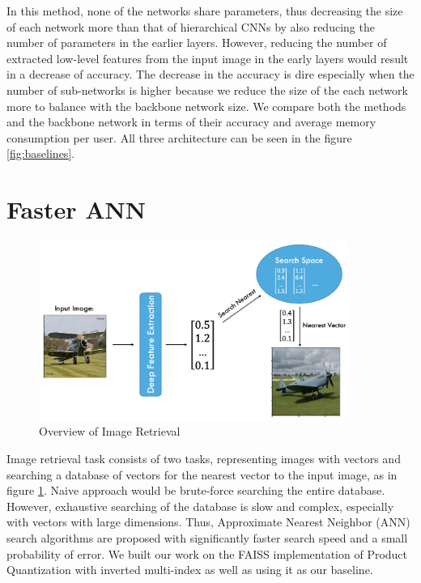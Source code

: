 In this method, none of the networks share parameters, thus decreasing the size of each network more than that of hierarchical CNNs by also reducing the number of parameters in the earlier layers. 
However, reducing the number of extracted low-level features from the input image in the early layers would result in a decrease of accuracy. 
The decrease in the accuracy is dire especially when the number of sub-networks is higher because we reduce the size of the each network more to balance with the backbone network size. 
We compare both the methods and the backbone network in terms of their accuracy and average memory consumption per user. 
All three architecture can be seen in the figure \ref{fig:baselines}.


\section{Faster ANN}
\label{sec:FasterANN}

\begin{figure}
    \centering
    \includegraphics[width=0.9\textwidth]{thesis/images/image_ret_exp-fig.png}
    \caption{Overview of Image Retrieval}
    \label{fig:ret-exp}
\end{figure}

Image retrieval task consists of two tasks, representing images with vectors and searching a database of vectors for the nearest vector to the input image, as in figure \ref{fig:ret-exp}. 
Naive approach would be brute-force searching the entire database.
However, exhaustive searching of the database is slow and complex, especially with vectors with large dimensions. 
Thus, Approximate Nearest Neighbor (ANN) search algorithms are proposed with significantly faster search speed and a small probability of error. 
We built our work on the FAISS implementation\cite{faiss} of Product Quantization\cite{jegou2010product} with inverted multi-index as well as using it as our baseline.

